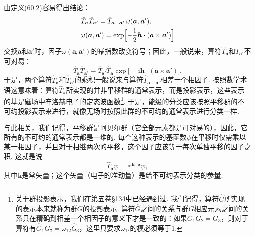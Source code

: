 由定义(60.2)容易得出结论：
\begin{equation}
\begin{aligned}
&\hat T_{\bm a}\hat T_{\bm a'}=\hat T_{\bm a+\bm a'}\,\omega(\bm a,\bm a'),\\
&\omega(\bm a,\bm a')=\exp\Bigl[-\frac{\mathrm i}{2}\bm h\cdot(\bm a\times\bm a')\Bigr]
\end{aligned}
\label{60.3}
\end{equation}
交换$\bm a$和$\bm a'$时，因子$\omega(\bm a,\bm a')$的幂指数改变符号；因此，一般说来，算符$\hat T_{\bm a}$和$\hat T_{\bm a'}$不可对易：
\begin{equation}
\hat T_{\bm a}\hat T_{\bm a'}=\hat T_{\bm a'}\hat T_{\bm a}\exp\bigl[-\mathrm i\bm h\cdot(\bm a\times\bm a')\bigr].
\label{60.4}
\end{equation}
于是，两个算符$\hat T_{\bm a}$和$\hat T_{\bm a'}$的乘积一般说来与算符$\hat T_{\bm a+\bm a'}$相差一个相因子. 按照数学术语这意味着：算符$\hat T_{\bm a}$所实现的并非平移群的通常表示，而是投影表示，这些表示的基是磁场中布洛赫电子的定态波函数\footnote{关于群投影表示，我们在第五卷§134中已经遇到过. 我们记得，算符$\hat G$所实现的表示本来就称为群$G$的投影表示. 算符$\hat G$之间的关系与群$G$相应元素之间的关系只在精确到相差一个相因子的意义下才是一致的：如果$G_1G_2=G_3$，则对于算符有$\hat G_1\hat G_2=\omega_{12}\hat G_3$，这里只要求$\omega_{12}$的模必须等于1.}. 于是，能级的分类应该按照平移群的不可约投影表示来进行，就像无场时按照此群的不可约的通常表示进行分类一样.

与此相关，我们记得，平移群是阿贝尔群（它全部元素都是可对易的），因此，它所有的不可约的通常表示都是一维的. 每个这种表示的基函数$\psi$在平移时仅需乘以某一相因子，并且对于相继两次的平移，这个因子应该等于每次单独平移的因子之积. 这就是说
\begin{equation*}
\hat T_{\bm a}\psi=\mathrm e^{\mathrm i\bm k\cdot\bm a}\psi,
\end{equation*}
其中$\bm k$是常矢量；这个矢量（电子的准动量）是给不可约表示分类的参量.

